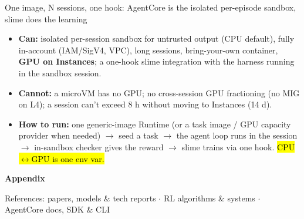 \begin{frame}{One image, N sessions, one hook: AgentCore is the isolated per-episode sandbox, slime does the learning}
\vspace{2mm}
\begin{itemize}\small\setlength{\itemsep}{3mm}
\item \textbf{\color{awsteal}Can:} isolated per-session sandbox for untrusted output (CPU default), fully in-account (IAM/SigV4, VPC), long sessions, bring-your-own container, \textbf{GPU on Instances}; a one-hook slime integration with the harness running in the sandbox session.
\item \textbf{\color{cat1}Cannot:} a microVM has no GPU; no cross-session GPU fractioning (no MIG on L4); a session can't exceed 8 h without moving to Instances (14 d).
\item \textbf{\color{awsteal}How to run:} one generic-image Runtime (or a task image / GPU capacity provider when needed) $\rightarrow$ seed a task $\rightarrow$ the agent loop runs in the session $\rightarrow$ in-sandbox checker gives the reward $\rightarrow$ slime trains via one  hook. \hl{CPU$\leftrightarrow$GPU is one env var.}
\end{itemize}
\vspace{3mm}
\end{frame}

\appendix
{
\begin{frame}[plain]
\vfill
{\fontsize{26}{30}\selectfont\bfseries\color{white}Appendix\par}
\vspace{3mm}
{\small\color{white}References: papers, models \& tech reports $\cdot$ RL algorithms \& systems $\cdot$ AgentCore docs, SDK \& CLI\par}
\vfill
\end{frame}}

